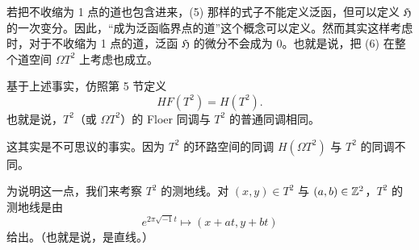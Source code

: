 若把不收缩为 1 点的道也包含进来，(5) 那样的式子不能定义泛函，但可以定义 $\mathfrak{H}$ 的一次变分。因此，“成为泛函临界点的道”这个概念可以定义。然而其实这样考虑时，对于不收缩为 1 点的道，泛函 $\mathfrak{H}$ 的微分不会成为 0。也就是说，把 (6) 在整个道空间 $\Omega T^{2}$ 上考虑也成立。

基于上述事实，仿照第 5 节定义
\[ HF(T^{2})=H(T^{2}). \]
也就是说，$T^{2}$（或 $\Omega T^{2}$）的 Floer 同调与 $T^{2}$ 的普通同调相同。

这其实是不可思议的事实。因为 $T^{2}$ 的环路空间的同调 $H(\Omega T^{2})$ 与 $T^{2}$ 的同调不同。

为说明这一点，我们来考察 $T^{2}$ 的测地线。对 $(x,y)\in T^{2}$ 与 $(a,b)\in\mathbb{Z}^{2}$，$T^{2}$ 的测地线是由
\[ e^{2\pi\sqrt{-1}t}\mapsto(x+at,y+bt) \]
给出。（也就是说，是直线。）
